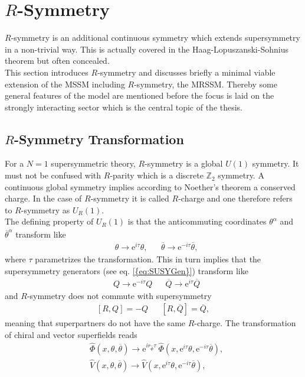 \section{$R$-Symmetry}
$R$-symmetry is an additional continuous symmetry which extends  supersymmetry in a non-trivial way. This is actually covered in the Haag-Lopuszanski-Sohnius theorem \cite{Haag:1974qh} but often concealed.\\
This section introduces $R$-symmetry and discusses briefly a minimal viable extension of the MSSM including $R$-symmetry, the MRSSM. Thereby some general features of the model are mentioned before the focus is laid on the strongly interacting sector which is the central topic of the thesis. 


\subsection{$R$-Symmetry Transformation}
For a $N=1$ supersymmetric theory, $R$-symmetry is a global $U(1)$ symmetry. It must not be confused with $R$-parity which is a discrete $\mathbb{Z}_2$ symmetry. A continuous global symmetry implies according to Noether's theorem a conserved charge. In the case of $R$-symmetry it is called $R$-charge and one therefore refers to $R$-symmetry as $U_R(1)$.\\
The defining property of $U_R(1)$ is that the anticommuting coordinates $\theta^\alpha$ and $\overline{\theta}^{\dot{\alpha}}$ transform like
\begin{align}
&\theta \to \mathrm{e}^{i\tau}\theta, && \overline{\theta} \to \mathrm{e}^{-i\tau}\overline{\theta},
\end{align}
where $\tau$ parametrizes the transformation. This in turn implies that the supersymmetry generators (see eq. \ref{{eq:SUSYGen}}) transform like
\begin{align}
& Q \to \mathrm{e}^{-i\tau} Q && \overline{Q} \to \mathrm{e}^{i\tau}\overline{Q}
\end{align}
and $R$-symmetry does not commute with supersymmetry 
\begin{align}
\left[ R,Q \right] = -Q && \left[ R,\overline{Q} \right] = \overline{Q},
\end{align}
meaning that superpartners do not have the same $R$-charge. The transformation of chiral and vector superfields reads
\begin{align}
& \hat{\Phi}(x,\theta,\overline{\theta}) \to \mathrm{e}^{ir_{\hat{\Phi}}\tau}\ \hat{\Phi}(x,\mathrm{e}^{i\tau}\theta,\mathrm{e}^{-i\tau}\overline{\theta}),\nonumber\\
&\hat{V}(x,\theta,\overline{\theta}) \to  \hat{V}(x,\mathrm{e}^{i\tau}\theta,\mathrm{e}^{-i\tau}\overline{\theta}),
\end{align}
